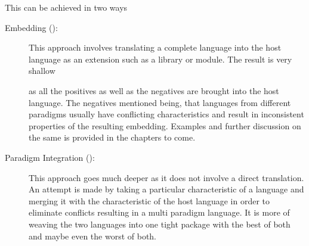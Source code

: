 \documentclass[thesis-solanki.tex]{subfiles}
\begin{document}
This can be achieved in two ways\yyy{,}{:}
\begin{description}
\item [Embedding ():]

  This approach involves translating a complete language into the host language as an extension such as a
  library or module.
  The result is very shallow
  \begin{comment}
    \endnote{%
      Are you defining what ``shallow'' means here?  Or are you arguing that as the result of the embedding being
      shallow that there are certain advantages and drawbacks?
    }
  \end{comment}
  as all the positives as well as the negatives are brought into the host language.
  The negatives mentioned being, that languages from different paradigms usually have conflicting characteristics
  and result in inconsistent properties of the resulting embedding.
  Examples and further discussion on the same is provided in the chapters to come.

\item [Paradigm Integration ():]

  This approach goes much deeper as it does not involve a direct translation.
  An attempt is made by taking a particular characteristic of a language and merging it with the characteristic of
  the host language in order to eliminate conflicts resulting in a multi paradigm language.
  It is more of weaving the two languages into one tight package with the best of both and maybe even the worst of
  both.
\end{description}


%
\end{document}
